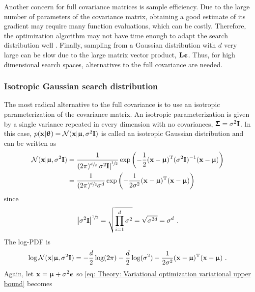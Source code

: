 Another concern for full covariance matrices is sample efficiency. Due to the large number of parameters of the covariance matrix, obtaining a good estimate of its gradient may require many function evaluations, which can be costly. Therefore, the optimization algorithm may not have time enough to adapt the search distribution well \cite{Schaul2011}. Finally, sampling from a Gaussian distribution with $d$ very large can be slow due to the large matrix vector product, ${\mathbf{L}}{\boldsymbol{\upepsilon}}$.
Thus, for high dimensional search spaces, alternatives to the full covariance are needed.



\subsubsection{Isotropic Gaussian search distribution}\label{sec: Theory: Variational optimization: Isotropic Gaussian search distribution}
The most radical alternative to the full covariance is to use an isotropic parameterization of the covariance matrix. An isotropic parameterization is given by a single variance repeated in every dimension with no covariances, ${\boldsymbol{\Upsigma}} = \sigma^2{\mathbf{I}}$. In this case, $p({\mathbf{x}}|{{\boldsymbol{\uptheta}}}) = \mathcal{N}({\mathbf{x}}|{\boldsymbol{\upmu}},\sigma^2{\mathbf{I}})$ is called an isotropic Gaussian distribution and can be written as
\begin{align}
    \mathcal{N}({\mathbf{x}}|{\boldsymbol{\upmu}},\sigma^2{\mathbf{I}})
    &= \frac{1}{(2\pi)^{\sfrac{d}{2}}{\left\lvert\sigma^2{\mathbf{I}}\right\rvert}^{\sfrac{1}{2}}}\exp{\left(-\frac{1}{2}({\mathbf{x}}-{\boldsymbol{\upmu}}){^\mathrm{T}}(\sigma^2{\mathbf{I}})^{-1}({\mathbf{x}}-{\boldsymbol{\upmu}})\right)}\nonumber\\
    &= \frac{1}{(2\pi)^{\sfrac{d}{2}}\sigma^d}\exp{\left(-\frac{1}{2\sigma^2}({\mathbf{x}}-{\boldsymbol{\upmu}}){^\mathrm{T}}({\mathbf{x}}-{\boldsymbol{\upmu}})\right)}
\end{align}
since
\begin{equation}
    {\left\lvert\sigma^2{\mathbf{I}}\right\rvert}^{\sfrac{1}{2}} = \sqrt{\prod_{i=1}^d \sigma^2} 
    = \sqrt{\sigma^{2d}} = \sigma^d \ .
\end{equation}
The log-\gls{PDF} is
\begin{equation}\label{eq: Theory: Variational optimization multivariate isotropic gaussian log pdf}
    \log\mathcal{N}({\mathbf{x}}|{\boldsymbol{\upmu}},\sigma^2{\mathbf{I}}) = -\frac{d}{2}\log(2\pi) - \frac{d}{2}\log(\sigma^2) - \frac{1}{2\sigma^2}({\mathbf{x}}-{\boldsymbol{\upmu}}){^\mathrm{T}}({\mathbf{x}}-{\boldsymbol{\upmu}}) \ .
\end{equation}
Again, let ${\mathbf{x}}={\boldsymbol{\upmu}}+\sigma^2{\boldsymbol{\upepsilon}}$ so \eqref{eq: Theory: Variational optimization variational upper bound} becomes
